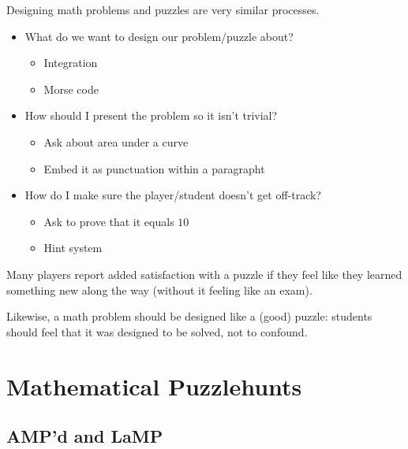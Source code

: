 \documentclass{beamer}
\theoremstyle{theorem}
\theoremstyle{definition}
\newcommand{\<}{\langle}
\renewcommand{\>}{\rangle}
\newcommand{\vpause}{\pause\vspace{1em}}
\begin{document}
\begin{frame}
  Designing math problems and puzzles are very similar processes.

  \pause

  \begin{itemize}
    \item What do we want to design our problem/puzzle about?
      \begin{itemize}
        \item Integration
        \item Morse code
      \end{itemize}
    \pause
    \item How should I present the problem so it isn't trivial?
      \begin{itemize}
        \item Ask about area under a curve
        \item Embed it as punctuation within a paragrapht
      \end{itemize}
    \pause
    \item How do I make sure the player/student doesn't get off-track?
      \begin{itemize}
        \item Ask to prove that it equals \(10\)
        \item Hint system
      \end{itemize}
  \end{itemize}
\end{frame}

\begin{frame}
  Many players report added satisfaction with a puzzle if they feel like they
  learned something new along the way (without it feeling like an exam).

  \vpause

  Likewise, a math problem should be designed like a (good) puzzle: students
  should feel that it was designed to be solved, not to confound.
\end{frame}

\section{Mathematical Puzzlehunts}

\subsection{AMP'd and LaMP}
\end{document}
